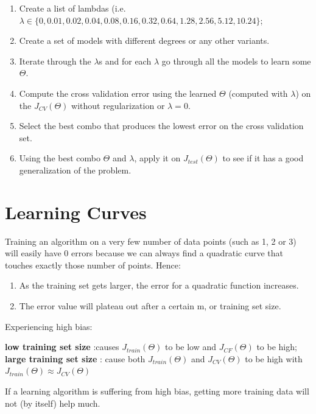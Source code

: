 \documentclass[10pt,a4paper,UTF8]{article}
\begin{document}
\begin{enumerate}
\item Create a list of lambdas (i.e. \(\lambda\in \{0,0.01,0.02,0.04,0.08,0.16,0.32,0.64,1.28,2.56,5.12,10.24\}\);
\item Create a set of models with different degrees or any other variants.
\item Iterate through the \(\lambda\)s and for each \(\lambda\) go through all the models to learn some \(\Theta\).
\item Compute the cross validation error using the learned \(\Theta\) (computed with \(\lambda\)) on the \(J_{CV}(\Theta)\) without regularization or \(\lambda=0\).
\item Select the best combo that produces the lowest error on the cross validation set.
\item Using the best combo \(\Theta\) and \(\lambda\), apply it on \(J_{test}(\Theta)\) to see if it has a good generalization of the problem.
\end{enumerate}

\section{Learning Curves}
\label{sec:org39660fa}


Training an algorithm on a very few number of data points (such as 1, 2 or 3) will easily have 0 errors because we can always find a quadratic curve that touches exactly those number of points. Hence:

\begin{enumerate}
\item As the training set gets larger, the error for a quadratic function increases.
\item The error value will plateau out after a certain m, or training set size.
\end{enumerate}

Experiencing high bias:

\textbf{low training set size} :causes \(J_{train}(\Theta)\) to be low and \(J_{CF}(\Theta)\) to be high;
\textbf{large training set size} : cause both \(J_{train}(\Theta)\) and \(J_{CV}(\Theta)\) to be high with \(J_{train}(\Theta)\approx J_{CV}(\Theta)\)

If a learning algorithm is suffering from high bias, getting more training data will not (by itself) help much.
\end{document}
